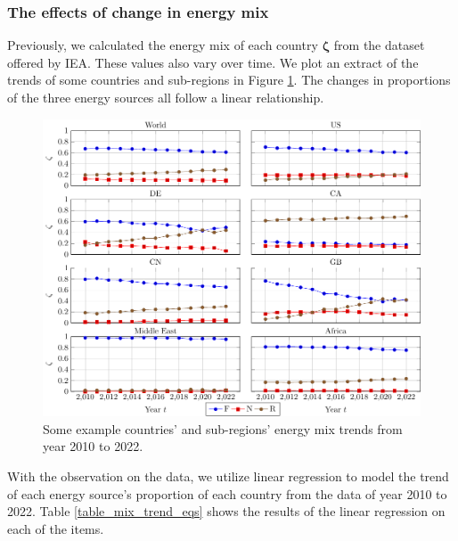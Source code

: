 \documentclass[12pt]{article}
\begin{document}
\subsubsection{The effects of change in energy mix}

Previously, we calculated the energy mix of each country $\boldsymbol{\zeta}$ from the dataset offered by IEA. These values also vary over time. We plot an extract of the trends of some countries and sub-regions in Figure \ref{fig_mix_data}. The changes in proportions of the three energy sources all follow a linear relationship.

\begin{figure}[!t]
	\centering
	\caption{Some example countries' and sub-regions' energy mix trends from year 2010 to 2022.}
	\label{fig_mix_data}
	\includegraphics{figures/mix/mix.pdf}
\end{figure}

With the observation on the data, we utilize linear regression to model the trend of each energy source's proportion of each country from the data of year 2010 to 2022. Table \ref{table_mix_trend_eqs} shows the results of the linear regression on each of the items.
\end{document}
